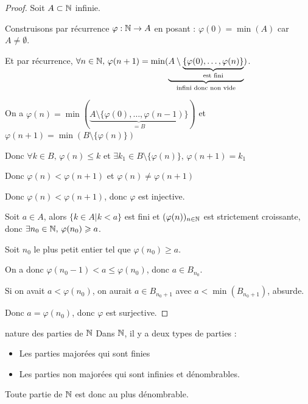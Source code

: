 \begin{proof}
    Soit $A \subset \mathbb{N}$ infinie. 

    Construisons par récurrence $\varphi : \mathbb{N} \to A$ en posant : $\varphi(0) = \min(A)$ car $A \neq \emptyset$.

    Et par récurrence, $\forall n \in \mathbb{N}, \, \varphi(n+1) = \min(\underbrace{A \setminus \underbrace{\{\varphi(0), \ldots, \varphi(n)\}}_{\text{est fini}}}_{\text{infini donc non vide}})$.


    \svspace On a $\varphi(n) = \min(\underbrace{A \setminus \{\varphi(0), \ldots, \varphi(n-1)\}}_{= B })$ 
    et $\varphi(n + 1) = \min(B \setminus \{ \varphi(n) \})$ 

    Donc $\forall k \in B, \, \varphi(n) \leqslant k$ et $\exists k_1 \in B \setminus \{\varphi(n)\}, \, \varphi(n + 1) = k_1$

    Donc $\varphi(n) < \varphi(n + 1)$ et $\varphi (n) \neq \varphi(n + 1)$

    Donc $\varphi(n) < \varphi(n + 1)$, donc $\varphi$ est injective.

    Soit $a \in A$, alors $\{k \in A | k < a\}$ est fini et $(\varphi(n))_{n \in \mathbb{N}}$ est strictement croissante, donc
    $\exists n_0 \in \mathbb{N}, \, \varphi(n_0) \geqslant a$.

    Soit $n_0$ le plus petit entier tel que $\varphi(n_0) \geqslant a$.

    On a donc $\varphi(n_0 - 1) < a \leqslant \varphi(n_0)$, donc $a \in B_{n_0}$. 

    Si on avait $a < \varphi(n_0)$, on aurait $a \in B_{n_0 + 1}$ avec $a < \min (B_{n_0 + 1})$, absurde. 
    
    Donc $a = \varphi(n_0)$, donc $\varphi$ est surjective.
\end{proof}


\begin{proposition}{nature des parties de $\mathbb{N}$}{}
    Dans $\mathbb{N}$, il y a deux types de parties : 
    \begin{itemize}
        \item Les parties majorées qui sont finies 
        \item Les parties non majorées qui sont infinies et dénombrables.
    \end{itemize}

    Toute partie de $\mathbb{N}$ est donc au plus dénombrable. 
\end{proposition}


